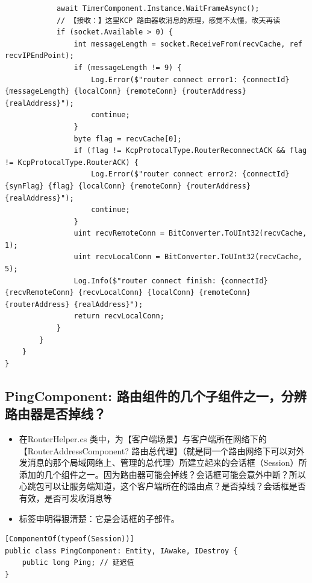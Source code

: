 \documentclass[9pt, b5paper]{article}
\begin{document}
\begin{verbatim}
            await TimerComponent.Instance.WaitFrameAsync(); 
            // 【接收：】这里KCP 路由器收消息的原理，感觉不太懂，改天再读
            if (socket.Available > 0) {
                int messageLength = socket.ReceiveFrom(recvCache, ref recvIPEndPoint);
                if (messageLength != 9) {
                    Log.Error($"router connect error1: {connectId} {messageLength} {localConn} {remoteConn} {routerAddress} {realAddress}");
                    continue;
                }
                byte flag = recvCache[0];
                if (flag != KcpProtocalType.RouterReconnectACK && flag != KcpProtocalType.RouterACK) {
                    Log.Error($"router connect error2: {connectId} {synFlag} {flag} {localConn} {remoteConn} {routerAddress} {realAddress}");
                    continue;
                }
                uint recvRemoteConn = BitConverter.ToUInt32(recvCache, 1);
                uint recvLocalConn = BitConverter.ToUInt32(recvCache, 5);
                Log.Info($"router connect finish: {connectId} {recvRemoteConn} {recvLocalConn} {localConn} {remoteConn} {routerAddress} {realAddress}");
                return recvLocalConn;
            }
        }
    }
}
\end{verbatim}
\subsection{PingComponent: 路由组件的几个子组件之一，分辨路由器是否掉线？}
\label{sec:org810eb83}
\begin{itemize}
\item 在RouterHelper.cs 类中，为【客户端场景】与客户端所在网络下的【RouterAddressComponent? 路由总代理】（就是同一个路由网络下可以对外发消息的那个局域网络上、管理的总代理）所建立起来的会话框（Session）所添加的几个组件之一。因为路由器可能会掉线？会话框可能会意外中断？所以心跳包可以让服务端知道，这个客户端所在的路由点？是否掉线？会话框是否有效，是否可发收消息等
\item 标签申明得狠清楚：它是会话框的子部件。
\end{itemize}
\begin{verbatim}
[ComponentOf(typeof(Session))]
public class PingComponent: Entity, IAwake, IDestroy {
    public long Ping; // 延迟值
}
\end{verbatim}
\end{document}
